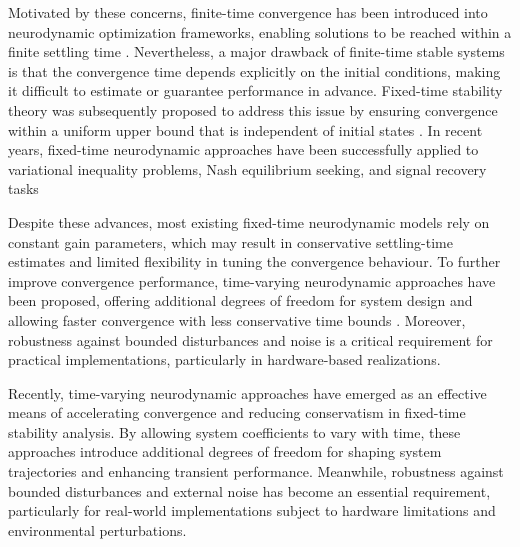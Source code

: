 \documentclass{article}
\theoremstyle{plain}%
\theoremstyle{thmstyletwo}%
\theoremstyle{thmstylethree}%
\begin{document}
Motivated by these concerns, finite-time convergence has been introduced into neurodynamic optimization frameworks, enabling solutions to be reached within a finite settling time  \cite{JuX21Novel, JuX21Neuro, JuX25}. Nevertheless, a major drawback of finite-time stable systems is that the convergence time depends explicitly on the initial conditions, making it difficult to estimate or guarantee performance in advance. Fixed-time stability theory was subsequently proposed to address this issue by ensuring convergence within a uniform upper bound that is independent of initial states \cite{Garg23, JuX23, JuX25,Zheng22, Liao23, Nguyen23}. In recent years, fixed-time neurodynamic approaches have been successfully applied to variational inequality problems, Nash equilibrium seeking, and signal recovery tasks \cite{Zheng22, Polyakov12, JuX21Novel}


Despite these advances, most existing fixed-time neurodynamic models rely on constant gain parameters, which may result in conservative settling-time estimates and limited flexibility in tuning the convergence behaviour. To further improve convergence performance, time-varying neurodynamic approaches have been proposed, offering additional degrees of freedom for system design and allowing faster convergence with less conservative time bounds \cite{JuX25, Zheng24}. Moreover, robustness against bounded disturbances and noise is a critical requirement for practical implementations, particularly in hardware-based realizations.

Recently, time-varying neurodynamic approaches have emerged as an effective means of accelerating convergence and reducing conservatism in fixed-time stability analysis. By allowing system coefficients to vary with time, these approaches introduce additional degrees of freedom for shaping system trajectories and enhancing transient performance. Meanwhile, robustness against bounded disturbances and external noise has become an essential requirement, particularly for real-world implementations subject to hardware limitations and environmental perturbations.
\end{document}
